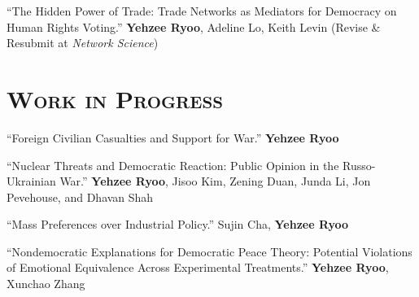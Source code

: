 \documentclass[11pt, letterpaper]{article}
\begin{document}
\vspace{1mm}
``The Hidden Power of Trade: Trade Networks as Mediators for Democracy on Human Rights Voting.'' \textbf{Yehzee Ryoo}, Adeline Lo, Keith Levin (Revise \& Resubmit at \textit{Network Science})


\vspace{-3mm}
\section*{\textsc{Work in Progress}}

``Foreign Civilian Casualties and Support for War.''
\textbf{Yehzee Ryoo}


\vspace{1mm}
``Nuclear Threats and Democratic Reaction: Public Opinion in the Russo-Ukrainian War.'' \textbf{Yehzee Ryoo}, Jisoo Kim, Zening Duan, Junda Li, Jon Pevehouse, and Dhavan Shah %




\vspace{1mm}
``Mass Preferences over Industrial Policy.''
Sujin Cha, \textbf{Yehzee Ryoo}

\vspace{1mm}
``Nondemocratic Explanations for Democratic Peace Theory: Potential Violations of Emotional Equivalence Across Experimental Treatments.''
\textbf{Yehzee Ryoo}, Xunchao Zhang
\end{document}
